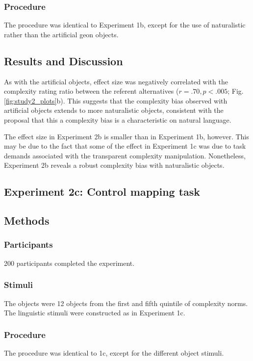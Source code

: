\documentclass[man]{apa2}
\begin{document}
\subsubsection{Procedure} The procedure was identical to Experiment 1b, except for the use of naturalistic rather than the artificial geon objects. 

\subsection{Results and Discussion}
As with the artificial objects, effect size was negatively correlated with the complexity rating ratio between the referent alternatives ($r = .70, p < .005$; Fig. \ref{fig:study2_plots}b).  This suggests  that the complexity bias observed with artificial objects extends to more naturalistic objects, consistent with the proposal that this a complexity bias is a characteristic on natural language. 

The effect size in Experiment 2b is smaller than in Experiment 1b, however. This may be due to the fact that some of the effect in Experiment 1c was due to task demands associated with the transparent complexity manipulation. Nonetheless, Experiment 2b reveals a robust complexity bias with naturalistic objects.


\subsection{\textbf{Experiment 2c: Control mapping task}}
\subsection{Methods}
\subsubsection{Participants} 200 participants completed the experiment. 
\subsubsection{Stimuli} The objects were 12 objects from the first and fifth quintile of complexity norms. The linguistic stimuli were constructed as in Experiment 1c. 

\subsubsection{Procedure}
The procedure was identical to 1c, except for the different object stimuli.
\end{document}
